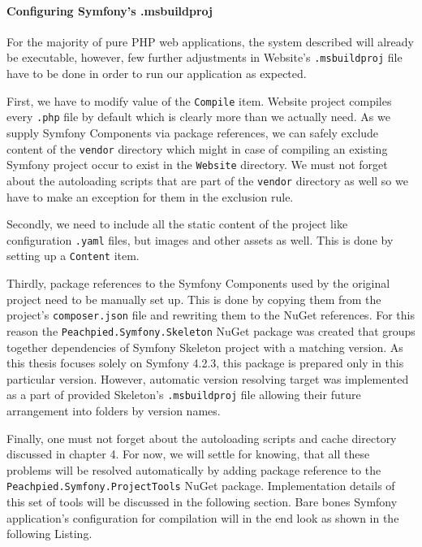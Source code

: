 \paragraph{Configuring Symfony's .msbuildproj} For the majority of pure PHP web applications, the system described will already be executable, however, few further adjustments in Website's \texttt{.msbuildproj} file have to be done in order to run our application as expected.

First, we have to modify value of the \texttt{Compile} item. Website project compiles every \texttt{.php} file by default which is clearly more than we actually need. As we supply Symfony Components via package references, we can safely exclude content of the \texttt{vendor} directory which might in case of compiling an existing Symfony project occur to exist in the \texttt{Website} directory. We must not forget about the autoloading scripts that are part of the \texttt{vendor} directory as well so we have to make an exception for them in the exclusion rule.

Secondly, we need to include all the static content of the project like configuration \texttt{.yaml} files, but images and other assets as well. This is done by setting up a \texttt{Content} item.

Thirdly, package references to the Symfony Components used by the original project need to be manually set up. This is done by copying them from the project's \texttt{composer.json} file and rewriting them to the NuGet references. For this reason the \texttt{Peachpied.Symfony.Skeleton} NuGet package was created that groups together dependencies of Symfony Skeleton project with a matching version. As this thesis focuses solely on Symfony 4.2.3, this package is prepared only in this particular version. However, automatic version resolving target was implemented as a part of provided Skeleton's \texttt{.msbuildproj} file allowing their future arrangement into folders by version names.

Finally, one must not forget about the autoloading scripts and cache directory discussed in chapter 4. For now, we will settle for knowing, that all these problems will be resolved automatically by adding package reference to the \texttt{Peachpied.Symfony.ProjectTools} NuGet package. Implementation details of this set of tools will be discussed in the following section. Bare bones Symfony application's configuration for compilation will in the end look as shown in the following Listing.

